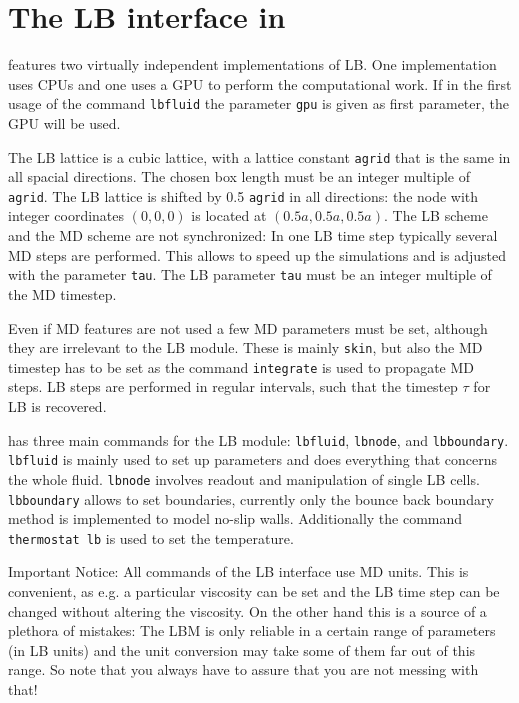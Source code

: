 

\section{The LB interface in \ES{}}
\ES{} features two virtually independent implementations of LB. One implementation
uses CPUs and one uses a GPU to perform the computational work. If in the first usage
of the command \texttt{lbfluid} the parameter \texttt{gpu} is given as first
parameter, the GPU will be used.

The LB lattice is a cubic lattice, with a lattice constant \texttt{agrid} that
is the same in all spacial directions. The chosen box length must be an integer multiple
of \texttt{agrid}. The LB lattice is shifted by 0.5 \texttt{agrid} in all directions: the node
with integer coordinates $\left(0,0,0\right)$ is located at
$\left(0.5a,0.5a,0.5a\right)$.
The LB scheme and the MD scheme are not synchronized: In one
LB time step typically several MD steps are performed. This allows to speed
up the simulations and is adjusted with the parameter \texttt{tau}.
The LB parameter \texttt{tau} must be an integer multiple of the MD timestep.

Even if MD features are not used a few MD parameters must be set, although they are irrelevant
to the LB module. These is mainly \texttt{skin}, but also the MD timestep has to be
set as the command \texttt{integrate} is used to propagate MD steps. LB steps are performed 
in regular intervals, such that the timestep $\tau$ for LB is recovered. 

\ES{} has three main commands for the LB module: 
 \texttt{lbfluid},  \texttt{lbnode}, and  \texttt{lbboundary}.
 \texttt{lbfluid} is mainly used to set up parameters and does everything that
concerns the whole fluid.  \texttt{lbnode} involves readout and manipulation of
single LB cells.  \texttt{lbboundary} allows to set boundaries, currently only
the bounce back boundary method is implemented to model
no-slip walls. Additionally the command  \texttt{thermostat lb} is used to set
the temperature. 


Important Notice: All commands of the LB interface use
MD units. This is convenient, as e.g. a particular 
viscosity can be set and the LB time step can be changed without
altering the viscosity. On the other hand this is a source
of a plethora of mistakes: The LBM is only reliable in a certain 
range of parameters (in LB units) and the unit conversion
may take some of them far out of this range. So note that you always
have to assure that you are not messing with that!

